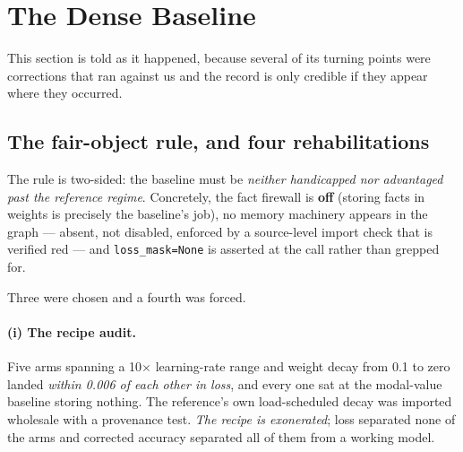 \section{The Dense Baseline}
\label{sec:dense}

This section is told as it happened, because several of its turning points were corrections that ran
against us and the record is only credible if they appear where they occurred.

\subsection{The fair-object rule, and four rehabilitations}

The rule is two-sided: the baseline must be \emph{neither handicapped nor advantaged past the
reference regime}. Concretely, the fact firewall is \textbf{off} (storing facts in weights is
precisely the baseline's job), no memory machinery appears in the graph --- absent, not disabled,
enforced by a source-level import check that is verified red --- and \texttt{loss\_mask=None} is
asserted at the call rather than grepped for.

Three were chosen and a fourth was forced.

\paragraph{(i) The recipe audit.} Five arms spanning a 10$\times$ learning-rate range and weight
decay from 0.1 to zero landed \emph{within 0.006 of each other in loss}, and every one sat at the
modal-value baseline storing nothing. The reference's own load-scheduled decay was imported
wholesale with a provenance test. \emph{The recipe is exonerated}; loss separated none of the arms
and corrected accuracy separated all of them from a working model.


